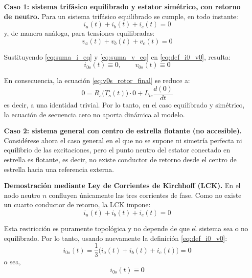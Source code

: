 \documentclass[12pt, a4paper,journal, onecolumn, compsoc]{IEEEtran}
\begin{document}
    \textbf{Caso 1: sistema trifásico equilibrado y estator simétrico, con retorno de neutro.}
    Para un sistema trifásico equilibrado se cumple, en todo instante:
    \begin{equation}
        i_a(t)+i_b(t)+i_c(t)=0
        \label{eq:suma_i_eq}
    \end{equation}
    y, de manera análoga, para tensiones equilibradas:
    \begin{equation}
        v_a(t)+v_b(t)+v_c(t)=0
        \label{eq:suma_v_eq}
    \end{equation}

    Sustituyendo \eqref{eq:suma_i_eq} y \eqref{eq:suma_v_eq} en \eqref{eq:def_i0_v0}, resulta:
    \begin{equation}
        i_{0s}(t)\equiv 0,
        \qquad
        v_{0s}(t)\equiv 0
    \end{equation}

    En consecuencia, la ecuación \eqref{eq:v0s_rotor_final} se reduce a:
    \begin{equation}
        0=R_s\!\big(T_s^\circ(t)\big)\cdot 0 + L_{ls}\frac{d(0)}{dt}
    \end{equation}
    es decir, a una identidad trivial. Por lo tanto, en el caso equilibrado y simétrico, la ecuación de secuencia cero no aporta dinámica al modelo.

    \textbf{Caso 2: sistema general con centro de estrella flotante (no accesible).}
    Considérese ahora el caso general en el que no se supone ni simetría perfecta ni equilibrio de las excitaciones, pero el punto neutro del estator conectado en estrella es flotante, es decir, no existe conductor de retorno desde el centro de estrella hacia una referencia externa.

    \textbf{Demostración mediante Ley de Corrientes de Kirchhoff (LCK).}
    En el nodo neutro \(n\) confluyen únicamente las tres corrientes de fase. Como no existe un cuarto conductor de retorno, la LCK impone:
    \begin{equation}
        i_a(t)+i_b(t)+i_c(t)=0
        \label{eq:LCK_neutro_flotante}
    \end{equation}

    Esta restricción es puramente topológica y no depende de que el sistema sea o no equilibrado. Por lo tanto, usando nuevamente la definición \eqref{eq:def_i0_v0}:
    \begin{equation}
        i_{0s}(t)=\frac{1}{3}\Big(i_a(t)+i_b(t)+i_c(t)\Big)=0
    \end{equation}
    o sea,
    \begin{equation}
        \boxed{i_{0s}(t)\equiv 0}
        \label{eq:i0_neutro_flotante}
    \end{equation}
\end{document}

